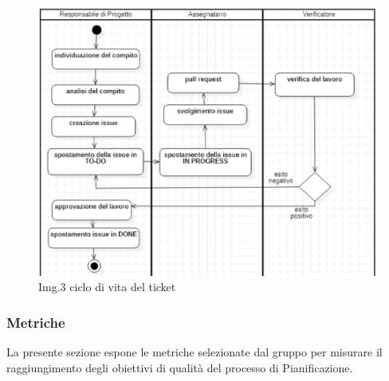 			\begin{figure}[H]
    				\centering
    				\includegraphics[width=1.0\textwidth]{res/images/vita_ticket.png}
				\caption{Img.3 ciclo di vita del ticket}
				\label{fig:Img.3 ciclo di vita del ticket}
			\end{figure}
		\subsubsection{Metriche}
			La presente sezione espone le metriche selezionate dal gruppo per misurare il raggiungimento degli obiettivi di qualità del processo di Pianificazione.
